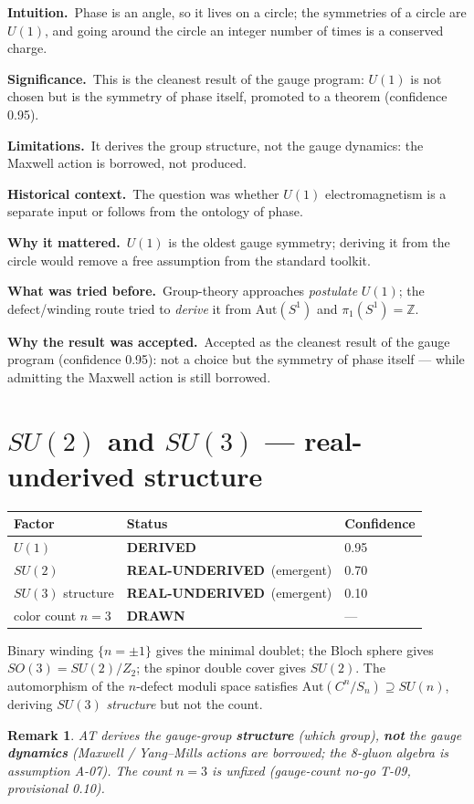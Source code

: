 \documentclass[10pt,twoside,openany]{book}
\newtheorem{remark}[theorem]{Remark}
\newcommand{\derived}{\textbf{DERIVED}}
\newcommand{\realunder}{\textbf{REAL-UNDERIVED}}
\newcommand{\drawn}{\textbf{DRAWN}}
\newcommand{\theoremnotes}[3]{%
  \par\medskip\noindent
  \textbf{Intuition.}\ #1\par
  \textbf{Significance.}\ #2\par
  \textbf{Limitations.}\ #3\par}
\newcommand{\historynotes}[4]{%
  \par\smallskip\noindent
  \textbf{Historical context.}\ #1\par
  \textbf{Why it mattered.}\ #2\par
  \textbf{What was tried before.}\ #3\par
  \textbf{Why the result was accepted.}\ #4\par}
\begin{document}
\theoremnotes
{Phase is an angle, so it lives on a circle; the symmetries of a circle are $U(1)$, and
going around the circle an integer number of times is a conserved charge.}
{This is the cleanest result of the gauge program: $U(1)$ is not chosen but is the symmetry
of phase itself, promoted to a theorem (confidence 0.95).}
{It derives the group structure, not the gauge dynamics: the Maxwell action is borrowed, not
produced.}

\historynotes
{The question was whether $U(1)$ electromagnetism is a separate input or follows from the
ontology of phase.}
{$U(1)$ is the oldest gauge symmetry; deriving it from the circle would remove a free
assumption from the standard toolkit.}
{Group-theory approaches \emph{postulate} $U(1)$; the defect/winding route tried to
\emph{derive} it from $\mathrm{Aut}(S^1)$ and $\pi_1(S^1)=\mathbb Z$.}
{Accepted as the cleanest result of the gauge program (confidence 0.95): not a choice but
the symmetry of phase itself --- while admitting the Maxwell action is still borrowed.}

\section{$SU(2)$ and $SU(3)$ — real-underived structure}

\begin{center}
\begin{tabular}{lll}
\toprule
Factor & Status & Confidence \\
\midrule
$U(1)$ & \derived & 0.95 \\
$SU(2)$ & \realunder\ (emergent) & 0.70 \\
$SU(3)$ structure & \realunder\ (emergent) & 0.10 \\
color count $n=3$ & \drawn & — \\
\bottomrule
\end{tabular}
\end{center}

Binary winding $\{n=\pm1\}$ gives the minimal doublet; the Bloch sphere gives
$SO(3)=SU(2)/Z_2$; the spinor double cover gives $SU(2)$. The automorphism of the
$n$-defect moduli space satisfies $\mathrm{Aut}(C^n/S_n)\supseteq SU(n)$, deriving
$SU(3)$ \emph{structure} but not the count.

\begin{remark}
AT derives the gauge-group \textbf{structure} (which group), \textbf{not} the gauge
\textbf{dynamics} (Maxwell / Yang--Mills actions are borrowed; the 8-gluon algebra is
assumption A-07). The count $n=3$ is unfixed (gauge-count no-go T-09, provisional 0.10).
\end{remark}
\end{document}
